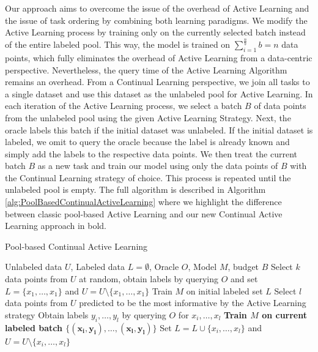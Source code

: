 Our approach aims to overcome the issue of the overhead of Active Learning and the issue of task ordering by combining both learning paradigms. We modify the Active
Learning process by training only on the currently selected batch instead of the entire labeled pool. This way, the model is trained on $\sum_{i=1}^{\frac{n}{b}} b = n$ 
data points, which fully eliminates the overhead of Active Learning from a data-centric perspective. Nevertheless, the query time of the Active Learning Algorithm remains
an overhead. From a Continual Learning perspective, we join all tasks to a single dataset and use this dataset as the unlabeled pool for Active Learning. In each iteration
of the Active Learning process, we select a batch $B$ of data points from the unlabeled pool using the given Active Learning Strategy. Next, the oracle labels this batch
if the initial dataset was unlabeled. If the initial dataset is labeled, we omit to query the oracle because the label is already known and simply add the labels
to the respective data points. We then treat the current batch $B$ as a new task and train our model using only the data points of $B$ with the Continual Learning strategy of
choice. This process is repeated until the unlabeled pool is empty. The full algorithm is described in Algorithm \ref{alg:PoolBasedContinualActiveLearning} where we highlight
the difference between classic pool-based Active Learning and our new Continual Active Learning approach in bold. \par

\begin{algorithm}
    \caption{Pool-based Continual Active Learning} \label{alg:PoolBasedContinualActiveLearning}
    \begin{algorithmic}[1]
        \Require Unlabeled data $U$, Labeled data $L = \emptyset$, Oracle $O$, Model $M$, budget $B$
        \State Select $k$ data points from $U$ at random, obtain labels by querying $O$ and set $L=\{x_1,\ldots,x_1\}$
        and $U = U \setminus \{x_1,\ldots,x_1\}$ 
        \State Train $M$ on initial labeled set $L$
            \State Select $l$ data points from $U$ predicted to be the most informative by the Active Learning strategy
            \State Obtain labels $y_i,\ldots,y_l$ by querying $O$ for $x_i,\ldots,x_l$
            \State \textbf{Train $M$ on current labeled batch $\{\mathbf{(x_i,y_i),\ldots,(x_l,y_l)}\}$}
            \State Set $L= L \cup \{x_i,\ldots,x_l\}$ and $U = U \setminus \{x_i,\ldots,x_l\}$
        \EndWhile
    \end{algorithmic}
\end{algorithm}

